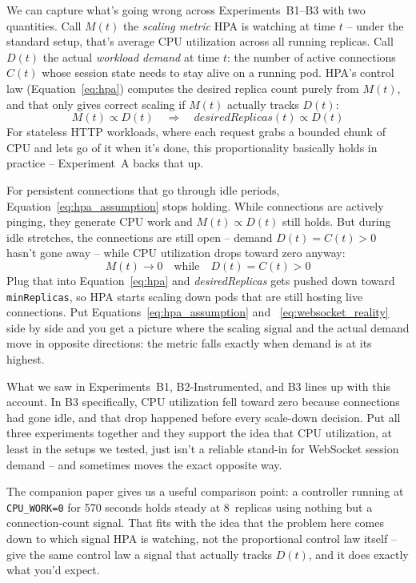 \documentclass[pdflatex,sn-mathphys-num]{sn-jnl}
\theoremstyle{thmstyleone}%
\theoremstyle{thmstyletwo}%
\theoremstyle{thmstylethree}%
\begin{document}
We can capture what's going wrong across Experiments~B1--B3 with two quantities.
Call $M(t)$ the \textit{scaling metric} HPA is watching at time $t$ -- under the
standard setup, that's average CPU utilization across all running replicas. Call
$D(t)$ the actual \textit{workload demand} at time $t$: the number of active
connections $C(t)$ whose session state needs to stay alive on a running pod. HPA's
control law (Equation~\ref{eq:hpa}) computes the desired replica count purely from
$M(t)$, and that only gives correct scaling if $M(t)$ actually tracks $D(t)$:
\begin{equation}
M(t) \propto D(t) \quad \Longrightarrow \quad
\textit{desiredReplicas}(t) \propto D(t)
\label{eq:hpa_assumption}
\end{equation}
For stateless HTTP workloads, where each request grabs a bounded chunk of CPU and
lets go of it when it's done, this proportionality basically holds in practice --
Experiment~A backs that up.

For persistent connections that go through idle periods, Equation~\ref{eq:hpa_assumption}
stops holding. While connections are actively pinging, they generate CPU work and
$M(t) \propto D(t)$ still holds. But during idle stretches, the connections are
still open -- demand $D(t) = C(t) > 0$ hasn't gone away -- while CPU utilization
drops toward zero anyway:
\begin{equation}
M(t) \to 0 \quad \text{while} \quad D(t) = C(t) > 0
\label{eq:websocket_reality}
\end{equation}
Plug that into Equation~\ref{eq:hpa} and \textit{desiredReplicas} gets pushed down
toward \texttt{minReplicas}, so HPA starts scaling down pods that are still hosting
live connections. Put Equations~\ref{eq:hpa_assumption} and
~\ref{eq:websocket_reality} side by side and you get a picture where the scaling
signal and the actual demand move in opposite directions: the metric falls exactly
when demand is at its highest.

What we saw in Experiments~B1, B2-Instrumented, and B3 lines up with this account.
In B3 specifically, CPU utilization fell toward zero because connections had gone
idle, and that drop happened before every scale-down decision. Put all three
experiments together and they support the idea that CPU utilization, at least in
the setups we tested, just isn't a reliable stand-in for WebSocket session demand
-- and sometimes moves the exact opposite way.

The companion paper gives us a useful comparison point: a controller running at
\texttt{CPU\_WORK=0} for 570 seconds holds steady at 8~replicas using nothing but a
connection-count signal. That fits with the idea that the problem here comes down
to which signal HPA is watching, not the proportional control law itself -- give
the same control law a signal that actually tracks $D(t)$, and it does exactly what
you'd expect.
\end{document}
